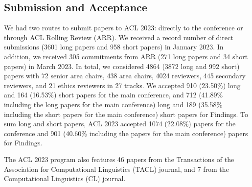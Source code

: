 



\subsection*{Submission and Acceptance}
We had two routes to submit papers to ACL 2023: directly to the conference or through ACL Rolling Review (ARR). We received a record number of direct submissions (3601 long papers and 958 short papers) in January 2023. In addition, we received 305 commitments from ARR (271 long papers and 34 short papers) in March 2023. In total, we considered 4864 (3872 long and 992 short) papers with 72 senior area chairs, 438 area chairs, 4024 reviewers, 445 secondary reviewers, and 21 ethics reviewers in 27 tracks. We accepted 910 (23.50\%) long and 164 (16.53\%) short papers for the main conference, and 712 (41.89\% including the long papers for the main conference) long and 189 (35.58\% including the short papers for the main conference) short papers for Findings. To sum long and short papers, ACL 2023 accepted 1074 (22.08\%) papers for the conference and 901 (40.60\% including the papers for the main conference) papers for Findings.

The ACL 2023 program also features 46 papers from the Transactions of the Association for Computational Linguistics (TACL) journal, and 7 from the Computational Linguistics (CL) journal.


